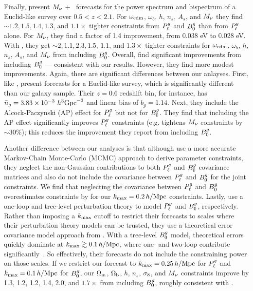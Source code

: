 Finally, \cite{chudaykin2019} present $M_\nu$ + \lcdm~forecasts for the power
spectrum and bispectrum of a Euclid-like survey over $0.5 < z < 2.1$. For
$\omega_{\rm cdm}$, $\omega_b$, $h$, $n_s$, $A_s$, and $M_\nu$ they find
${\sim}1.2, 1.5, 1.4, 1.3$, and $1.1\times$ tighter constraints from $P^g_{\ell}$ and
$B^g_0$ than from $P^g_{\ell}$ alone. For $M_\nu$, they find a factor of 1.4 improvement, 
from 0.038 eV to 0.028 eV. With \planck, they get ${\sim}2, 1.1, 2.3, 1.5$,
$1.1$, and $1.3\times$ tighter constraints for $\omega_{\rm cdm}$, $\omega_b$,
$h$, $n_s$, $A_s$, and $M_\nu$ from including $B^g_0$. Overall, \cite{chudaykin2019} 
find significant improvements from including $B^g_0$ --- consistent with our
results. However, they find more modest improvements. 
Again, there are significant differences between our anlayses. First, like
\cite{yankelevich2019}, \cite{chudaykin2019} present forecasts for a
Euclid-like survey, which is significantly different than our galaxy sample.
Their $z = 0.6$ redshift bin, for instance, has $\bar{n}_g = 3.83 \times 10^{-3}~h^3{\rm
Gpc}^{-3}$ and linear bias of $b_g = 1.14$. Next, they include the
Alcock-Paczynski (AP) effect for $P^g_{\ell}$ but not for $B^g_0$. They find that
including the AP effect significantly improves $P^g_{\ell}$ constraints (e.g.
tightens $M_\nu$ constraints by ${\sim}30\%$); this reduces the improvement
they report from including $B^g_0$. 

Another difference between our analyses is that although \cite{chudaykin2019} use 
a more accurate Markov-Chain Monte-Carlo (MCMC) approach to derive parameter
constraints, they neglect the non-Gaussian contributions to both $P^g_{\ell}$ and
$B^g_0$ covariance matrices and also do not include the covariance between $P^g_{\ell}$
and $B^g_0$ for the joint constraints. We find that neglecting the covariance
between $P^g_{\ell}$ and $B^g_0$ overestimates constraints by  for our
$k_{\rm max}=0.2\,h/\mathrm{Mpc}$ constraints. Lastly, \cite{chudaykin2019} use a one-loop 
and tree-level perturbation theory to model $P^g_{\ell}$ and $B^g_0$, respectively.
Rather than imposing a $k_{\rm max}$ cutoff to restrict their forecasts to scales
where their perturbation theory models can be trusted, they use a theoretical
error covariance model approach from \cite{baldauf2016}. With a tree-level
$B^g_0$ model, theoretical errors quickly dominate at $k_{\rm max} \gtrsim 0.1\,h/\mathrm{Mpc}$,
where one- and two-loop contribute significantly~\citep[\eg][]{lazanu2018}. 
So effectively, their forecasts do not include the constraining power on
those scales. If we restrict our forecast to $k_{\rm max} = 0.25\,h/\mathrm{Mpc}$ 
for $P^g_{\ell}$ and $k_{\rm max} = 0.1\,h/\mathrm{Mpc}$ for $B^g_0$, our $\Omega_{\rm m}$, $\Omega_{\rm b}$, $h$, $n_s$, 
$\sigma_8$, and $M_\nu$ constraints improve by 1.3, 1.2, 1.2, 1.4, 2.0, and 
$1.7\times$ from including $B^g_0$, roughly consistent with \cite{chudaykin2019}. 

